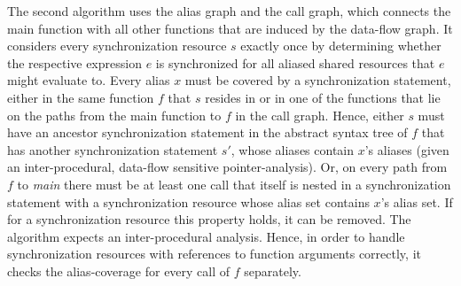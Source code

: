 The second algorithm uses the alias graph and the call graph, which connects the main function with all other functions that are induced by the data-flow graph. It considers every synchronization resource $s$ exactly once by determining whether the respective expression $e$ is synchronized for all aliased shared resources that $e$ might evaluate to. Every alias $x$ must  be covered by a synchronization statement, either in the same function $f$ that $s$ resides in or in one of the functions that lie on the paths from the main function to $f$ in the call graph. Hence, either $s$ must have an ancestor synchronization statement in the abstract syntax tree of $f$ that has another synchronization statement $s'$, whose aliases contain $x$'s aliases (given an inter-procedural, data-flow sensitive pointer-analysis). Or, on every path from $f$ to \textit{main} there must be at least one call that itself is nested in a synchronization statement with a synchronization resource whose alias set contains $x$'s alias set. If for a synchronization resource this property holds, it can be removed. The algorithm expects an inter-procedural analysis. Hence, in order to handle synchronization resources with references to function arguments correctly, it checks the alias-coverage for every call of $f$ separately.

